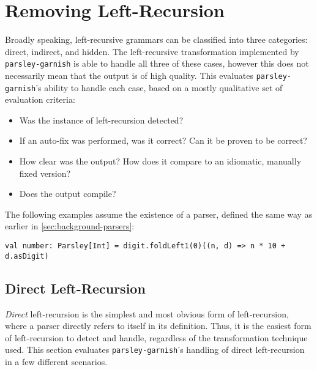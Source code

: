 \documentclass[../../main.tex]{subfiles}
\begin{document}



\section{Removing Left-Recursion}\label{sec:eval-leftrec}
Broadly speaking, left-recursive grammars can be classified into three categories: direct, indirect, and hidden.
The left-recursive transformation implemented by \texttt{parsley-garnish} is able to handle all three of these cases, however this does not necessarily mean that the output is of high quality.
This  evaluates \texttt{parsley-garnish}'s ability to handle each case, based on a mostly qualitative set of evaluation criteria:
\begin{itemize}
  \item Was the instance of left-recursion detected?
  \item If an auto-fix was performed, was it correct? Can it be proven to be correct?
  \item How clear was the output? How does it compare to an idiomatic, manually fixed version?
  \item Does the output compile?
\end{itemize}
%
The following examples assume the existence of a  parser, defined the same way as earlier in \cref{sec:background-parsers}:
\begin{verbatim}
val number: Parsley[Int] = digit.foldLeft1(0)((n, d) => n * 10 + d.asDigit)
\end{verbatim}

\subsection{Direct Left-Recursion}
\emph{Direct} left-recursion is the simplest and most obvious form of left-recursion, where a parser directly refers to itself in its definition.
Thus, it is the easiest form of left-recursion to detect and handle, regardless of the transformation technique used.
This section evaluates \texttt{parsley-garnish}'s handling of direct left-recursion in a few different scenarios.
\end{document}
